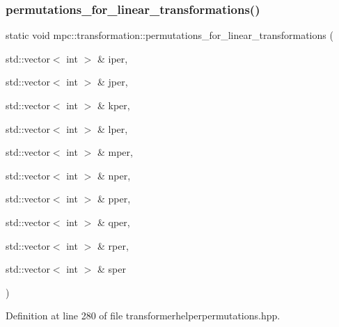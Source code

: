 \subsubsection{\texorpdfstring{permutations\+\_\+for\+\_\+linear\+\_\+transformations()}{permutations\_for\_linear\_transformations()}\hspace{0.1cm}{\footnotesize\ttfamily [10/11]}}
{\footnotesize\ttfamily static void mpc\+::transformation\+::permutations\+\_\+for\+\_\+linear\+\_\+transformations (\begin{DoxyParamCaption}\item[{std\+::vector$<$ int $>$ \&}]{iper,  }\item[{std\+::vector$<$ int $>$ \&}]{jper,  }\item[{std\+::vector$<$ int $>$ \&}]{kper,  }\item[{std\+::vector$<$ int $>$ \&}]{lper,  }\item[{std\+::vector$<$ int $>$ \&}]{mper,  }\item[{std\+::vector$<$ int $>$ \&}]{nper,  }\item[{std\+::vector$<$ int $>$ \&}]{pper,  }\item[{std\+::vector$<$ int $>$ \&}]{qper,  }\item[{std\+::vector$<$ int $>$ \&}]{rper,  }\item[{std\+::vector$<$ int $>$ \&}]{sper }\end{DoxyParamCaption})\hspace{0.3cm}{\ttfamily [static]}}



Definition at line 280 of file transformerhelperpermutations.\+hpp.

\mbox{\label{namespacempc_1_1transformation_a355316f26f98f04d0cc528e7417e1d9e}} 
